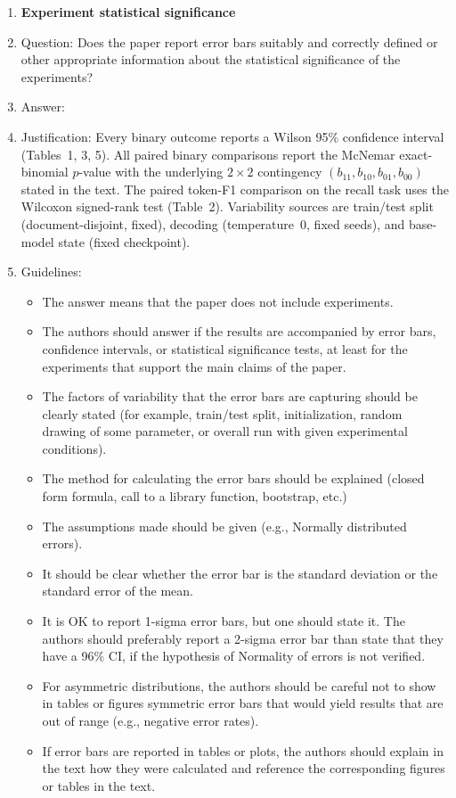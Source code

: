\begin{enumerate}
\item {\bf Experiment statistical significance}
    \item[] Question: Does the paper report error bars suitably and correctly defined or other appropriate information about the statistical significance of the experiments?
    \item[] Answer: \answerYes{}
    \item[] Justification: Every binary outcome reports a Wilson 95\% confidence interval (Tables~1, 3, 5). All paired binary comparisons report the McNemar exact-binomial $p$-value with the underlying $2\times2$ contingency $(b_{11},b_{10},b_{01},b_{00})$ stated in the text. The paired token-F1 comparison on the recall task uses the Wilcoxon signed-rank test (Table~2). Variability sources are train/test split (document-disjoint, fixed), decoding (temperature~0, fixed seeds), and base-model state (fixed checkpoint).
    \item[] Guidelines:
    \begin{itemize}
        \item The answer \answerNA{} means that the paper does not include experiments.
        \item The authors should answer \answerYes{} if the results are accompanied by error bars, confidence intervals, or statistical significance tests, at least for the experiments that support the main claims of the paper.
        \item The factors of variability that the error bars are capturing should be clearly stated (for example, train/test split, initialization, random drawing of some parameter, or overall run with given experimental conditions).
        \item The method for calculating the error bars should be explained (closed form formula, call to a library function, bootstrap, etc.)
        \item The assumptions made should be given (e.g., Normally distributed errors).
        \item It should be clear whether the error bar is the standard deviation or the standard error of the mean.
        \item It is OK to report 1-sigma error bars, but one should state it. The authors should preferably report a 2-sigma error bar than state that they have a 96\% CI, if the hypothesis of Normality of errors is not verified.
        \item For asymmetric distributions, the authors should be careful not to show in tables or figures symmetric error bars that would yield results that are out of range (e.g., negative error rates).
        \item If error bars are reported in tables or plots, the authors should explain in the text how they were calculated and reference the corresponding figures or tables in the text.
    \end{itemize}


\end{enumerate}
